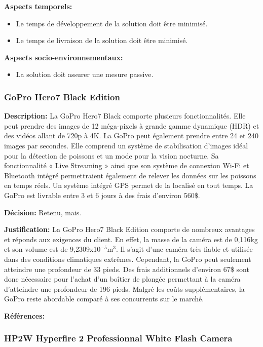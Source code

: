 \textbf{Aspects temporels:}
\begin{itemize}[label = {--}]
    \item Le temps de développement de la solution doit être minimisé.
    \item Le temps de livraison de la solution doit être minimisé.
\end{itemize}

\textbf{Aspects socio-environnementaux:}
\begin{itemize}[label = {--}]
    \item La solution doit assurer une mesure passive.
\end{itemize}

\subsubsection{GoPro Hero7 Black Edition}

\textbf{Description:} La GoPro Hero7 Black comporte plusieurs fonctionnalités. Elle peut prendre des images de 12 méga-pixels à grande gamme dynamique (HDR) et des vidéos allant de 720p à 4K. La GoPro peut également prendre entre 24 et 240 images par secondes. Elle comprend un système de stabilisation d'images idéal pour la détection de poissons et un mode pour la vision nocturne. Sa fonctionnalité « Live Streaming » ainsi que son système de connexion Wi-Fi et Bluetooth intégré permettraient également de relever les données sur les poissons en temps réels. Un système intégré GPS permet de la localisé en tout temps. La GoPro est livrable entre 3 et 6 jours à des frais d'environ 560\$.

\textbf{Décision:} Retenu, mais.

\textbf{Justification:} La GoPro Hero7 Black Edition comporte de nombreux avantages et réponds aux exigences du client. En effet, la masse de la caméra est de 0,116kg et son volume est de 9,2309x10$^{-5}$m$^3$. Il s'agit d'une caméra très fiable et utilisée dans des conditions climatiques extrêmes. Cependant, la GoPro peut seulement atteindre une profondeur de 33 pieds. Des frais additionnels d'environ 67\$ sont donc nécessaire pour l'achat d'un boîtier de plongée permettant à la caméra d'atteindre une profondeur de 196 pieds. Malgré les coûts supplémentaires, la GoPro reste abordable comparé à ses concurrents sur le marché.

\textbf{Références:} \cite{GoPro_Specs} \cite{GoPro_Waterproof}


\subsubsection{HP2W Hyperfire 2 Professionnal White Flash Camera}
\label{subsubsectionHyperfire}

